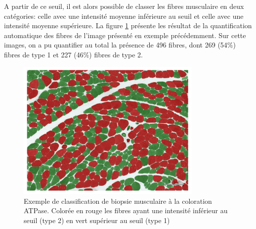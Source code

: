 A partir de ce seuil, il est alors possible de classer les fibres musculaire en deux catégories: celle avec une intensité moyenne inférieure au seuil et celle avec une intensité moyenne supérieure. La figure \ref{fig:apt_paint} présente les résultat de la quantification automatique des fibres de l'image présenté en exemple précédemment. Sur cette images, on a pu quantifier au total la présence de 496 fibres, dont 269 (54\%) fibres de type 1 et 227 (46\%) fibres de type 2. 
\begin{figure}[htbp]
 \centering
 \includegraphics[width=0.8\textwidth]{figures/atp_paint.png}
 \caption[Exemple de classification de biopsie musculaire à la coloration ATPase]{Exemple de classification de biopsie musculaire à la coloration ATPase. Colorée en rouge les fibres ayant une intensité inférieur au seuil (type 2) en vert supérieur au seuil (type 1)}
 \label{fig:apt_paint}
\end{figure}

